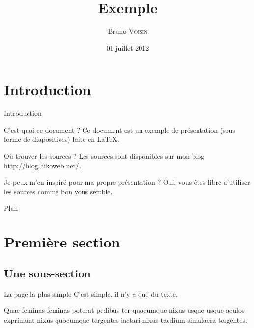 \documentclass[utf8,compress]{beamer}
\title{Exemple}
\subtitle{\slidesubject}
\author{Bruno \textsc{Voisin}}
\institute{
    Université de \LaTeX\\
    Entreprise\\
    \vspace{0.8em}
    \emph{- Responsables -} \\
    M.~Maitre \textsc{Destage}\\
    M.~En \textsc{Cadran}
}
\date{01 juillet 2012}
\begin{document}
\begin{frame}
\titlepage
\end{frame}



\section{Introduction}

\begin{frame}{Introduction}
\begin{block}{C'est quoi ce document ?}
    Ce document est un exemple de présentation (sous forme de diapositives) faite en LaTeX.
\end{block}
\begin{block}{Où trouver les sources ?}
    Les sources sont disponibles sur mon blog \url{http://blog.hikoweb.net/}.
\end{block}
\begin{block}{Je peux m'en inspiré pour ma propre présentation ?}
    Oui, vous êtes libre d'utiliser les sources comme bon vous semble.
\end{block}
\end{frame}

\begin{frame}{Plan}
\tableofcontents
\end{frame}



\section{Première section}

\subsection{Une sous-section}

\begin{frame}{La page la plus simple}
C'est simple, il n'y a que du texte.

Quae feminas feminas poterat pedibus ter quocumque nixus usque usque oculos exprimunt nixus quocumque tergentes iactari nixus taedium simulacra tergentes.
\end{frame}
\end{document}
